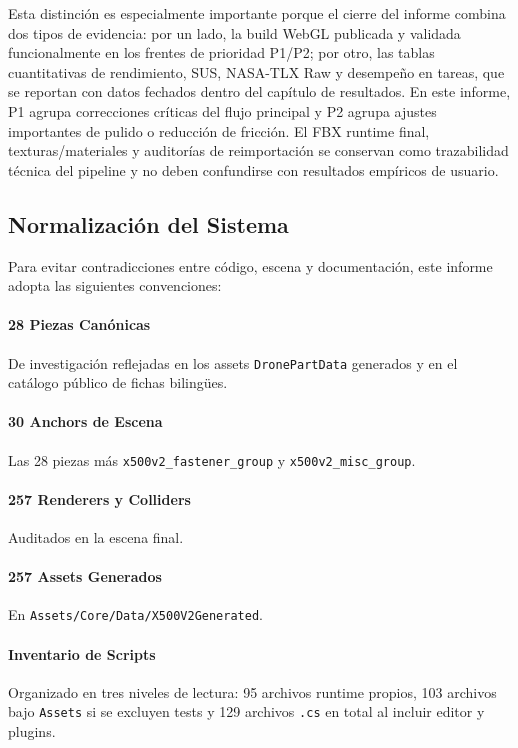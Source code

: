 Esta distinción es especialmente importante porque el cierre del informe combina dos tipos de evidencia: por un lado, la build WebGL publicada y validada funcionalmente en los frentes de prioridad P1/P2; por otro, las tablas cuantitativas de rendimiento, SUS, NASA-TLX Raw y desempeño en tareas, que se reportan con datos fechados dentro del capítulo de resultados. En este informe, P1 agrupa correcciones críticas del flujo principal y P2 agrupa ajustes importantes de pulido o reducción de fricción. El FBX runtime final, texturas/materiales y auditorías de reimportación se conservan como trazabilidad técnica del pipeline y no deben confundirse con resultados empíricos de usuario.

\subsection{Normalización del Sistema}

Para evitar contradicciones entre código, escena y documentación, este informe adopta las siguientes convenciones:

\paragraph{28 Piezas Canónicas} De investigación reflejadas en los assets \texttt{DronePartData} generados y en el catálogo público de fichas bilingües.

\paragraph{30 Anchors de Escena} Las 28 piezas más \texttt{x500v2\_fastener\_group} y \texttt{x500v2\_misc\_group}.

\paragraph{257 Renderers y Colliders} Auditados en la escena final.

\paragraph{257 Assets Generados} En \texttt{Assets/Core/Data/X500V2Generated}.

\paragraph{Inventario de Scripts} Organizado en tres niveles de lectura: 95 archivos runtime propios, 103 archivos bajo \texttt{Assets} si se excluyen tests y 129 archivos \texttt{.cs} en total al incluir editor y plugins.

